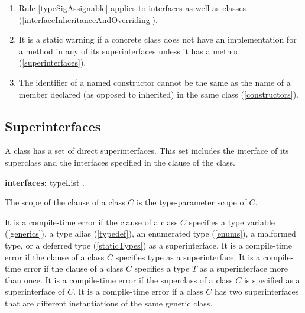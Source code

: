 \documentclass{article}
\begin{document}
{\begin{enumerate}
\begin{itemize}
  \end{itemize}  (\ref{interfaceInheritanceAndOverriding})
\item  Rule \ref{typeSigAssignable} applies to interfaces as well as classes  (\ref{interfaceInheritanceAndOverriding}).
\item  It is a static warning if a concrete class does not have an implementation for a  method in any of its superinterfaces  unless it has a  method (\ref{superinterfaces}).
\item The identifier of a named constructor cannot be the same as the name of a member declared (as opposed to inherited) in the same class (\ref{constructors}).
\end{enumerate}
}



\subsection{ Superinterfaces}

\LMHash{}
A class has a set of direct superinterfaces. This set includes the interface of its superclass and the interfaces specified in the \IMPLEMENTS{}  clause of the class.

\begin{grammar}
{\bf interfaces:}
      \IMPLEMENTS{} typeList
    .
\end{grammar}

\LMHash{}
The scope of the \IMPLEMENTS{} clause of a class $C$ is the type-parameter scope of $C$.

\LMHash{}
It is a compile-time error if the \IMPLEMENTS{} clause of a class $C$ specifies a type variable (\ref{generics}), a type alias (\ref{typedef}), an enumerated type (\ref{enums}), a malformed type, or a deferred type (\ref{staticTypes}) as a superinterface.
It is a compile-time error if the \IMPLEMENTS{} clause of a class $C$ specifies type \DYNAMIC{} as a superinterface.
It is a compile-time error if the \IMPLEMENTS{} clause of a class $C$ specifies a type $T$ as a superinterface more than once.
It is a compile-time error if the superclass of a class $C$ is specified as a superinterface of $C$.
It is a compile-time error if a class $C$ has two superinterfaces that are different instantiations of the same generic class. 
\end{document}
